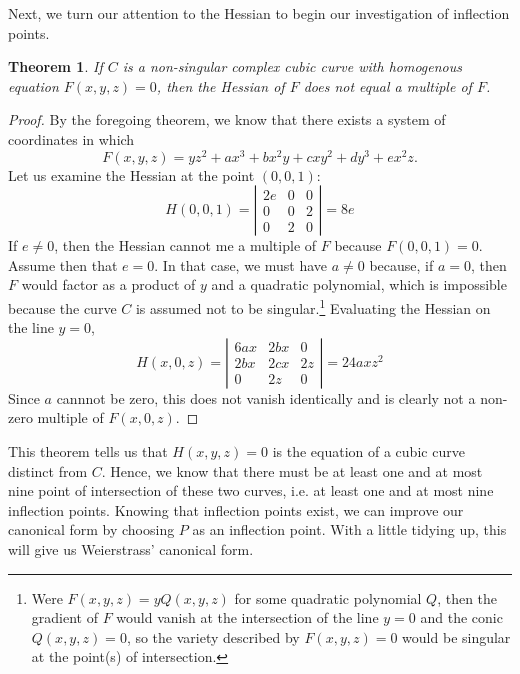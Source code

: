 \documentclass[12pt]{article}
\newtheorem{thm}{Theorem}
\begin{document}
Next, we turn our attention to the Hessian to begin our
investigation of inflection points.

\begin{thm}
If $C$ is a non-singular complex cubic curve with homogenous
equation $F(x,y,z) = 0$, then the Hessian of $F$ does not equal
a multiple of $F$.
\end{thm}

\begin{proof}
By the foregoing theorem, we know that there exists
a system of coordinates in which
\[
 F(x,y,z) = y z^2 + a x^3 + b x^2 y + c x y^2 + d y^3 + e x^2 z .
\]
Let us examine the Hessian at the point $(0,0,1)$:
\[
 H(0,0,1) = \left| 
   \begin{matrix}
      2e  &  0  &  0 \\
       0  &  0  &  2 \\
       0  &  2  &  0
   \end{matrix}
   \right| = 8e
\]
If $e \neq 0$, then the Hessian cannot me a multiple of $F$
because $F(0,0,1) = 0$.  Assume then that $e = 0$.  In that
case, we must have $a \neq 0$ because, if $a = 0$, then $F$
would factor as a product of $y$ and a quadratic polynomial,
which is impossible because the curve $C$ is assumed not
to be singular.\footnote{Were $F(x,y,z) = y Q(x,y,z)$ for
some quadratic polynomial $Q$, then the gradient of $F$ 
would vanish at the intersection of the line $y = 0$ and 
the conic $Q(x,y,z) = 0$, so the variety described by 
$F(x,y,z) = 0$ would be singular at the point(s) of
intersection.}  Evaluating the Hessian on the line $y=0$,
\[
 H(x,0,z) = \left| 
   \begin{matrix}
     6 a x & 2 b x & 0 \\
     2 b x & 2 c x & 2 z \\
         0 &   2 z & 0
   \end{matrix}
   \right| = 24 a x z^2
\]
Since $a$ cannnot be zero, this does not vanish identically
and is clearly not a non-zero multiple of $F(x,0,z)$.
\end{proof}

This theorem tells us that $H(x,y,z) = 0$ is the equation of
a cubic curve distinct from $C$.  Hence, we know that there
must be at least one and at most nine point of intersection 
of these two curves, i.e. at least one and at most nine
inflection points.  Knowing that inflection points exist, we
can improve our canonical form by choosing $P$ as an
inflection point.  With a little tidying up, this will give us 
Weierstrass' canonical form.
\end{document}
